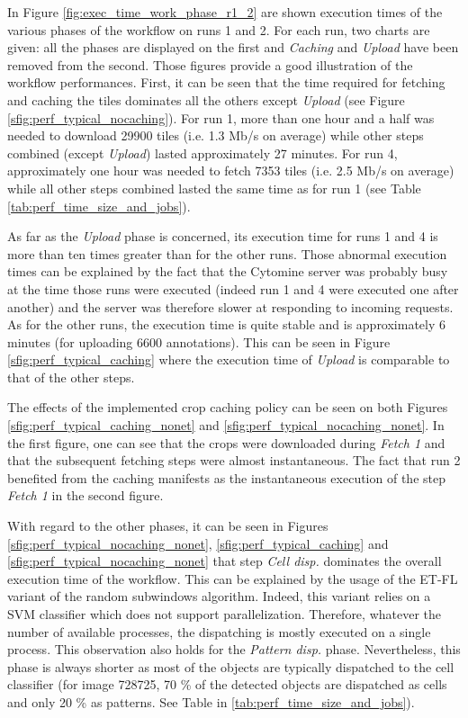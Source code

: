 In Figure \ref{fig:exec_time_work_phase_r1_2} are shown execution times of the various phases of the workflow on runs 1 and 2. For each run, two charts are given: all the phases are displayed on the first and \textit{Caching} and \textit{Upload} have been removed from the second. Those figures provide a good illustration of the workflow performances. First, it can be seen that the time required for fetching and caching the tiles dominates all the others except \textit{Upload} (see Figure \ref{sfig:perf_typical_nocaching}). For run 1, more than one hour and a half was needed to download 29900 tiles (i.e. 1.3 Mb/s on average) while other steps combined (except \textit{Upload}) lasted approximately 27 minutes. For run 4, approximately one hour was needed to fetch 7353 tiles (i.e. 2.5 Mb/s on average) while all other steps combined lasted the same time as for run 1 (see Table \ref{tab:perf_time_size_and_jobs}). 

As far as the \textit{Upload} phase is concerned, its execution time for runs 1 and 4 is more than ten times greater than for the other runs. Those abnormal execution times can be explained by the fact that the Cytomine server was probably busy at the time those runs were executed (indeed run 1 and 4 were executed one after another) and the server was therefore slower at responding to incoming requests. As for the other runs, the execution time is quite stable and is approximately 6 minutes (for uploading 6600 annotations). This can be seen in Figure \ref{sfig:perf_typical_caching} where the execution time of \textit{Upload} is comparable to that of the other steps.  

The effects of the implemented crop caching policy can be seen on both Figures \ref{sfig:perf_typical_caching_nonet} and \ref{sfig:perf_typical_nocaching_nonet}. In the first figure, one can see that the crops were downloaded during \textit{Fetch 1} and that the subsequent fetching steps were almost instantaneous. The fact that run 2 benefited from the caching manifests as the instantaneous execution of the step \textit{Fetch 1} in the second figure.

With regard to the other phases, it can be seen in Figures \ref{sfig:perf_typical_nocaching_nonet}, \ref{sfig:perf_typical_caching} and \ref{sfig:perf_typical_nocaching_nonet} that step \textit{Cell disp.} dominates the overall execution time of the workflow. This can be explained by the usage of the ET-FL variant of the random subwindows algorithm. Indeed, this variant relies on a SVM classifier which does not support parallelization. Therefore, whatever the number of available processes, the dispatching is mostly executed on a single process. This observation also holds for the \textit{Pattern disp.} phase. Nevertheless, this phase is always shorter as most of the objects are typically dispatched to the cell classifier (for image 728725, 70 \% of the detected objects are dispatched as cells and only 20 \% as patterns. See Table in \ref{tab:perf_time_size_and_jobs}). 

